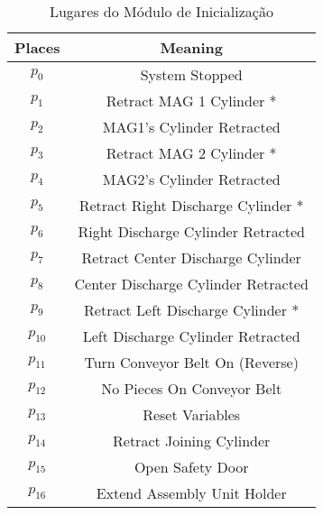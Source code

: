 \begin{table}[htbp]
\caption{Lugares do Módulo de Inicialização}
\centering
\begin{tabular}{c|c}
Places & Meaning\\
\hline
\hyperlink{partialNet:p0}{\hypertarget{partialTable:p0m1}{$p_{0}$}} & System Stopped\\
\hyperlink{partialNet:p1}{\hypertarget{partialTable:p1}{$p_{1}$}} & Retract MAG 1 Cylinder *\\
\hyperlink{partialNet:p2}{\hypertarget{partialTable:p2}{$p_{2}$}} & MAG1's Cylinder Retracted\\
\hyperlink{partialNet:p3}{\hypertarget{partialTable:p3}{$p_{3}$}} & Retract MAG 2 Cylinder *\\
\hyperlink{partialNet:p4}{\hypertarget{partialTable:p4}{$p_{4}$}} & MAG2's Cylinder Retracted\\
\hyperlink{partialNet:p5}{\hypertarget{partialTable:p5}{$p_{5}$}} & Retract Right Discharge Cylinder *\\
\hyperlink{partialNet:p6}{\hypertarget{partialTable:p6}{$p_{6}$}} & Right Discharge Cylinder Retracted\\
\hyperlink{partialNet:p7}{\hypertarget{partialTable:p7}{$p_{7}$}} & Retract Center Discharge Cylinder\\
\hyperlink{partialNet:p8}{\hypertarget{partialTable:p8}{$p_{8}$}} & Center Discharge Cylinder Retracted\\
\hyperlink{partialNet:p9}{\hypertarget{partialTable:p9}{$p_{9}$}} & Retract Left Discharge Cylinder *\\
\hyperlink{partialNet:p10}{\hypertarget{partialTable:p10}{$p_{10}$}} & Left Discharge Cylinder Retracted\\
\hyperlink{partialNet:p11}{\hypertarget{partialTable:p11}{$p_{11}$}} & Turn Conveyor Belt On (Reverse)\\
\hyperlink{partialNet:p12}{\hypertarget{partialTable:p12}{$p_{12}$}} & No Pieces On Conveyor Belt\\
\hyperlink{partialNet:p13}{\hypertarget{partialTable:p13}{$p_{13}$}} & Reset Variables\footnotemark\\
\hyperlink{partialNet:p14}{\hypertarget{partialTable:p14}{$p_{14}$}} & Retract Joining Cylinder\\
\hyperlink{partialNet:p15}{\hypertarget{partialTable:p15}{$p_{15}$}} & Open Safety Door\\
\hyperlink{partialNet:p16}{\hypertarget{partialTable:p16}{$p_{16}$}} & Extend Assembly Unit Holder\\

\end{tabular}
\end{table}
